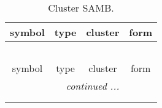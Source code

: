 \documentclass[fleqn,10pt,landscape]{article}
\begin{document}
\begin{itemize}
\begin{center}
\begin{longtable}{c|c|c|c}
\end{longtable}
\end{center}
\begin{center}
\renewcommand{\arraystretch}{1.3}
\begin{longtable}{c|c|c|c}
\caption{Cluster SAMB.}
 \\
 \hline \hline
symbol & type & cluster & form \\ \hline \endfirsthead

\multicolumn{3}{l}{\tablename\ \thetable{}} \\
 \hline \hline
symbol & type & cluster & form \\ \hline \endhead

 \hline \hline
\multicolumn{3}{r}{\footnotesize\it continued ...} \\ \endfoot

 \hline \hline
\multicolumn{3}{r}{} \\ \endlastfoot


\end{longtable}
\end{center}
\end{itemize}
\end{document}
